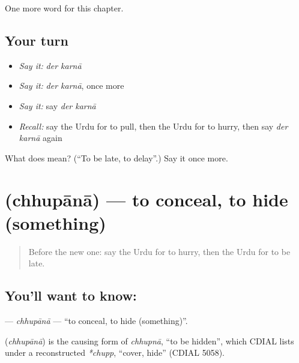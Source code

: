 \begin{grammarlens}[title={What you've built}]
One more word for this chapter.
\end{grammarlens}

\subsection*{Your turn}
\begin{itemize}
\raggedright
  \item \emph{Say it:} \emph{der karnā}
  \item \emph{Say it:} \emph{der karnā}, once more
  \item \emph{Say it:} say \emph{der karnā}
  \item \emph{Recall:} say the Urdu for to pull, then the Urdu for to hurry, then say \emph{der karnā} again
\end{itemize}

\begin{tcolorbox}[breakable,colback=teal!4,colframe=teal!35!black,title={Before you move on}]
What does   mean? (\textquotedblleft{}To be late, to delay\textquotedblright{}.) Say it once more.
\end{tcolorbox}
\section[\texorpdfstring{\ur{چھپانا} (chhupānā)}{چھپانا (chhupānā)}]{ (chhupānā) — to conceal, to hide (something)}

\label{lesson:UR-C214-chhupana}



\begin{quote}
Before the new one: say the Urdu for to hurry, then the Urdu for to be late.
\end{quote}

\subsection*{You'll want to know: }
\textbf{} — \emph{chhupānā} — \textquotedblleft{}to conceal, to hide (something)\textquotedblright{}.

\begin{cousinweb}
\textbf{} (\emph{chhupānā}) is the causing form of \emph{chhupnā}, \textquotedblleft{}to be hidden\textquotedblright{}, which CDIAL lists under a reconstructed \emph{*chupp}, \textquotedblleft{}cover, hide\textquotedblright{} (CDIAL 5058).
\end{cousinweb}


